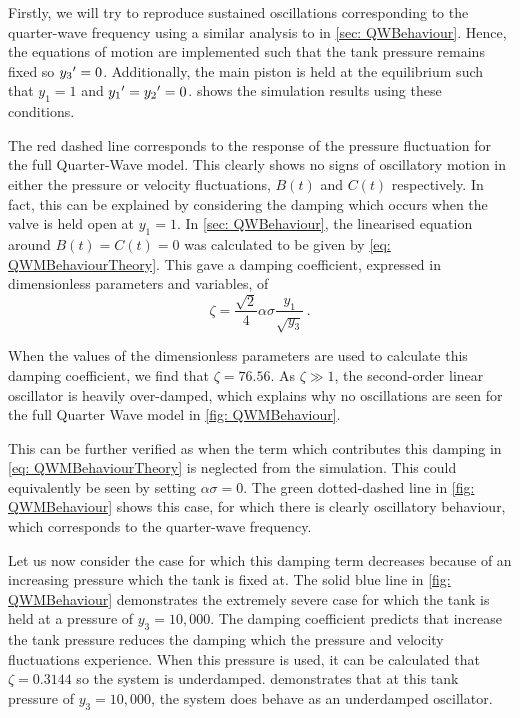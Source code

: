 Firstly, we will try to reproduce sustained oscillations corresponding to the quarter-wave frequency using a similar analysis to in \cref{sec: QWBehaviour}. Hence, the equations of motion are implemented such that the tank pressure remains fixed so $y_3{'} = 0$. Additionally, the main piston is held at the equilibrium such that $y_1 = 1$ and $y_1{'} = y_2{'} = 0$.  shows the simulation results using these conditions.

The red dashed line corresponds to the response of the pressure fluctuation for the full Quarter-Wave model. This clearly shows no signs of oscillatory motion in either the pressure or velocity fluctuations, $B(t)$ and $C(t)$ respectively. In fact, this can be explained by considering the damping which occurs when the valve is held open at $y_1 = 1$. In \cref{sec: QWBehaviour}, the linearised equation around $B(t) = C(t) = 0$ was calculated to be given by \cref{eq: QWMBehaviourTheory}. This gave a damping coefficient, expressed in dimensionless parameters and variables, of
~
\begin{equation*}
    \zeta = \frac{\sqrt{2}}{4} \alpha \sigma \frac{y_1}{\sqrt{y_3}} \, .
\end{equation*}

When the values of the dimensionless parameters are used to calculate this damping coefficient, we find that $\zeta = 76.56$. As $\zeta \gg 1$, the second-order linear oscillator is heavily over-damped, which explains why no oscillations are seen for the full Quarter Wave model in \cref{fig: QWMBehaviour}.

This can be further verified as when the term which contributes this damping in \cref{eq: QWMBehaviourTheory} is neglected from the simulation. This could equivalently be seen by setting $\alpha \sigma = 0$. The green dotted-dashed line in \cref{fig: QWMBehaviour} shows this case, for which there is clearly oscillatory behaviour, which corresponds to the quarter-wave frequency.

Let us now consider the case for which this damping term decreases because of an increasing pressure which the tank is fixed at. The solid blue line in \cref{fig: QWMBehaviour} demonstrates the extremely severe case for which the tank is held at a pressure of $y_3 = 10,000$. The damping coefficient predicts that increase the tank pressure reduces the damping which the pressure and velocity fluctuations experience. When this pressure is used, it can be calculated that $\zeta = 0.3144$ so the system is underdamped.  demonstrates that at this tank pressure of $y_3 = 10,000$, the system does behave as an underdamped oscillator.

